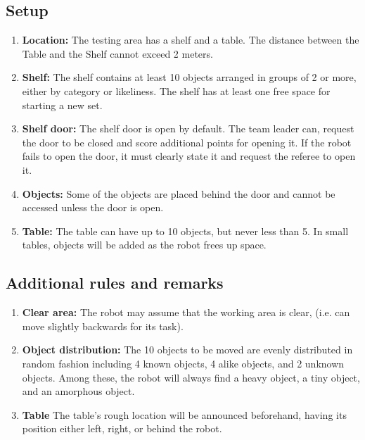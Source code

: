 \subsection{Setup}
\begin{enumerate}
	\item \textbf{Location:} The testing area has a shelf and a table.
	The distance between the Table and the Shelf cannot exceed 2 meters.

	\item \textbf{Shelf:} The shelf contains at least 10 objects arranged in groups of 2 or more, either by category or likeliness.
	The shelf has at least one free space for starting a new set.

	\item \textbf{Shelf door:} The shelf door is open by default.
	The team leader can, request the door to be closed and score additional points for opening it. If the robot fails to open the door, it must clearly state it and request the referee to open it.

	\item \textbf{Objects:} Some of the objects are placed behind the door and cannot be accessed unless the door is open.

	\item \textbf{Table:} The table can have up to 10 objects, but never less than 5.
	In small tables, objects will be added as the robot frees up space.
\end{enumerate}


%
%
\subsection{Additional rules and remarks}
\begin{enumerate}
	\item \textbf{Clear area:} The robot may assume that the working area is clear, (i.e. can move slightly backwards for its task).

	\item \textbf{Object distribution:} The 10 objects to be moved are evenly distributed in random fashion including
	4 known objects,
	4 alike objects, and
	2 unknown objects.
	Among these, the robot will always find
	a heavy object,
	a tiny object, and 
	an amorphous object.

	\item \textbf{Table} The table's rough location will be announced beforehand, having its position either left, right, or behind the robot.
\end{enumerate}

